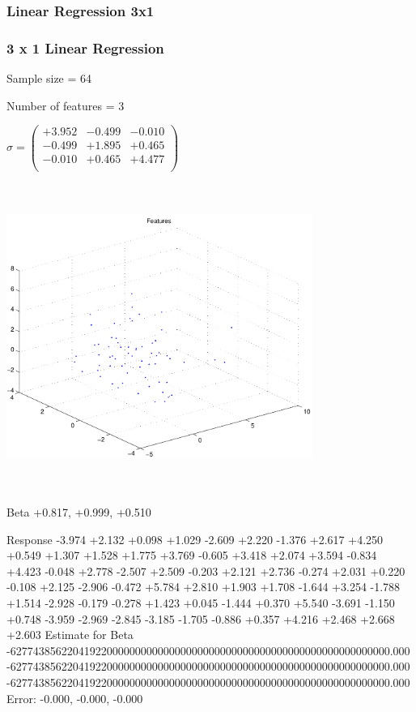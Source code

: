 \documentclass[9pt]{article}
\theoremstyle{plain}
\theoremstyle{definition}
\theoremstyle{remark}
\numberwithin{equation}{section}
\begin{document}
\subsubsection{Linear Regression 3x1}
\subsubsection{3 x 1 Linear Regression}
Sample size = 64

Number of features = 3

$\sigma = \left(
\begin{array}{
ccc}
+3.952 & -0.499 & -0.010 \\
-0.499 & +1.895 & +0.465 \\
-0.010 & +0.465 & +4.477 \\
\end{array}
\right)$ \newline 

\includegraphics[width=10.0cm,height=10.0cm]{regression_features.pdf}

Beta
+0.817, +0.999, +0.510

Response
-3.974
+2.132
+0.098
+1.029
-2.609
+2.220
-1.376
+2.617
+4.250
+0.549
+1.307
+1.528
+1.775
+3.769
-0.605
+3.418
+2.074
+3.594
-0.834
+4.423
-0.048
+2.778
-2.507
+2.509
-0.203
+2.121
+2.736
-0.274
+2.031
+0.220
-0.108
+2.125
-2.906
-0.472
+5.784
+2.810
+1.903
+1.708
-1.644
+3.254
-1.788
+1.514
-2.928
-0.179
-0.278
+1.423
+0.045
-1.444
+0.370
+5.540
-3.691
-1.150
+0.748
-3.959
-2.969
-2.845
-3.185
-1.705
-0.886
+0.357
+4.216
+2.468
+2.668
+2.603
Estimate for Beta
-6277438562204192200000000000000000000000000000000000000000000000000.000
-6277438562204192200000000000000000000000000000000000000000000000000.000
-6277438562204192200000000000000000000000000000000000000000000000000.000
Error:
-0.000, -0.000, -0.000
\end{document}
